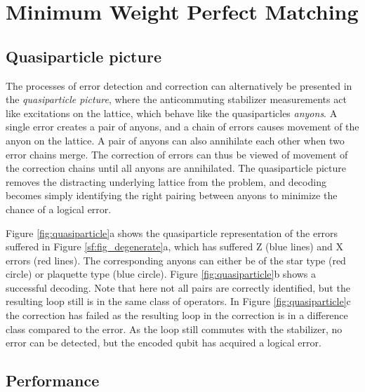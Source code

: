 
\chapter{Minimum Weight Perfect Matching}\label{sec:MWPMdecoder}


\section{Quasiparticle picture}
The processes of error detection and correction can alternatively be presented in the \emph{quasiparticle picture}, where the anticommuting stabilizer measurements act like excitations on the lattice, which behave like the quasiparticles \emph{anyons}. A single error creates a pair of anyons, and a chain of errors causes movement of the anyon on the lattice. A pair of anyons can also annihilate each other when two error chains merge. The correction of errors can thus be viewed of movement of the correction chains until all anyons are annihilated. The quasiparticle picture removes the distracting underlying lattice from the problem, and decoding becomes simply identifying the right pairing between anyons to minimize the chance of a logical error.

Figure \ref{fig:quasiparticle}a shows the quasiparticle representation of the errors suffered in Figure \ref{sf:fig_degenerate}a, which has suffered Z (blue lines) and X errors (red lines). The corresponding anyons can either be of the star type (red circle) or plaquette type (blue circle). Figure \ref{fig:quasiparticle}b shows a successful decoding. Note that here not all pairs are correctly identified, but the resulting loop still is in the same class of operators. In Figure \ref{fig:quasiparticle}c the correction has failed as the resulting loop in the correction is in a difference class compared to the error. As the loop still commutes with the stabilizer, no error can be detected, but the encoded qubit has acquired a logical error.



\section{Performance}

